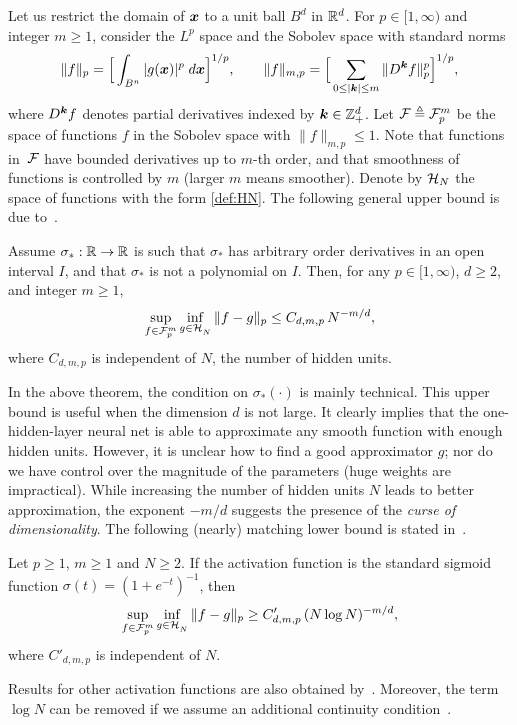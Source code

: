 Let us restrict the domain of $\text{\boldmath $x$}$ to a unit ball $B^d$ in $\mathbb{R}^d$. For $p \in [1,\infty)$ and integer $m \ge 1$, consider the $L^p$ space and the Sobolev space with standard norms
\begin{align*}
 \| f \|_p = \Big[ \int_{B^n} | g(\text{\boldmath $x$}) |^p \; d\text{\boldmath $x$}  \Big]^{1/p}, \qquad \| f \|_{m,p} = \Big[ \sum_{0 \le |\text{\boldmath $k$}| \le m} \| D^{\text{\boldmath $k$}} f \|_p^p \Big]^{1/p},
\end{align*}
where $D^{\text{\boldmath $k$}} f$ denotes partial derivatives indexed by $\text{\boldmath $k$} \in \mathbb{Z}_+^d$. Let $\mathcal{F} \triangleq \mathcal{F}^m_p$ be the space of functions $f$ in the Sobolev space with $\| f \|_{m,p} \le 1$. Note that functions in~$\mathcal{F}$ have bounded derivatives up to $m$-th order, and that smoothness of functions is controlled by $m$ (larger $m$ means smoother). Denote by $\mathcal{H}_N$ the space of functions with the form \eqref{def:HN}. The following general upper bound is due to~\cite{mhaskar1996neural}.
\begin{thm}\label{thm:approx1}
Assume $\sigma_*: \mathbb{R} \to \mathbb{R}$ is such that $\sigma_*$ has arbitrary order derivatives in an open interval $I$, and that $\sigma_*$ is not a polynomial on $I$. Then, for any $p \in [1,\infty)$, $d \ge 2$, and integer $m \ge 1$,
\begin{equation*}
\sup_{f \in \mathcal{F}^m_p} \inf_{g \in \mathcal{H}_N^{\phantom{a}}} \| f - g \|_p \le C_{d,m,p}\, N^{-m/d},
\end{equation*}
where $C_{d,m,p}$ is independent of $N$, the number of hidden units.
\end{thm}
In the above theorem, the condition on $\sigma_*(\cdot)$ is mainly technical. This upper bound is useful when the dimension $d$ is not large. It clearly implies that the one-hidden-layer neural net is able to approximate any smooth function with enough hidden units. However, it is unclear how to find a good approximator $g$; nor do we have control over the magnitude of the parameters (huge weights are impractical). While increasing the number of hidden units $N$ leads to better approximation, the exponent $-m/d$ suggests the presence of the \emph{curse of dimensionality}. The following (nearly) matching lower bound is %
stated in~\cite{maiorov2000near}.
\begin{thm}\label{thm:approx2-2}
Let $p \ge 1$, $m \ge 1$ and $N \ge 2$. If the activation function is the standard sigmoid function $\sigma(t) = (1 + e^{-t})^{-1}$, then
\begin{equation}\label{ineq:approxlower2}
\sup_{f \in \mathcal{F}^m_p} \inf_{g \in \mathcal{H}_N^{\phantom{a}}} \| f - g \|_p \ge C'_{d,m,p}\, (N\log N)^{-m/d},
\end{equation}
where $C'_{d,m,p}$ is independent of $N$.
\end{thm}
Results for other activation functions are also obtained by~\cite{maiorov2000near}. Moreover, the term $\log N$ can be removed if we assume an additional continuity condition~\citep{mhaskar1996neural}.

